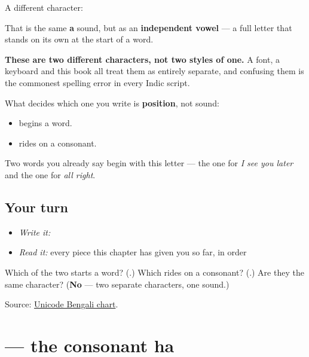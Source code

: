 A different character:

\begin{quote}
\end{quote}

That is the same \textbf{a} sound, but as an \textbf{independent vowel} — a full letter that stands on its own at the start of a word.

\textbf{These are two different characters, not two styles of one.} A font, a keyboard and this book all treat them as entirely separate, and confusing them is the commonest spelling error in every Indic script.

What decides which one you write is \textbf{position}, not sound:

\begin{itemize}
\raggedright
  \item \textbf{} begins a word.
  \item \textbf{} rides on a consonant.
\end{itemize}

Two words you already say begin with this letter — the one for \emph{I see you later} and the one for \emph{all right}.

\subsection*{Your turn}
\begin{itemize}
\raggedright
  \item \emph{Write it:} 
  \item \emph{Read it:} every piece this chapter has given you so far, in order
\end{itemize}

\begin{tcolorbox}[breakable,colback=teal!4,colframe=teal!35!black,title={Before you move on}]
Which of the two starts a word? (\textbf{}.) Which rides on a consonant? (\textbf{}.) Are they the same character? (\textbf{No} — two separate characters, one sound.)

Source: \href{https://www.unicode.org/charts/PDF/U0980.pdf}{Unicode Bengali chart}.
\end{tcolorbox}
\section[\texorpdfstring{\bn{হ} (hô)}{হ (hô)}]{ — the consonant ha}

\label{lesson:BN-W01-ha}



